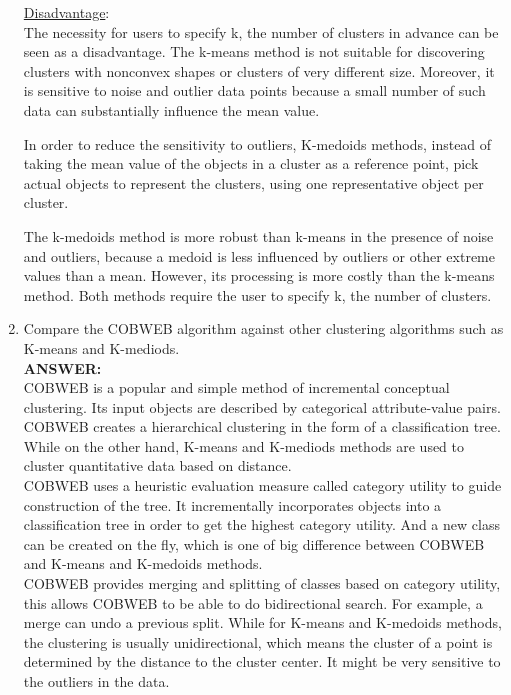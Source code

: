 \documentclass{article}
\begin{document}
\begin{enumerate}
\underline{Disadvantage}:\\
The necessity for users to specify k,
the number of clusters in advance can be seen as a disadvantage. The
k-means method is not suitable for discovering clusters with
nonconvex shapes or clusters of very different size.  Moreover, it is
sensitive to noise and outlier data points because a small number of
such data can substantially influence the mean value.

In order to reduce the sensitivity to outliers, K-medoids methods,
instead of taking the mean value of the objects in a cluster as a
reference point, pick actual objects to represent the clusters, using
one representative object per cluster.

The k-medoids method is more robust than k-means in the presence of
noise and outliers, because a medoid is less influenced by outliers or
other extreme values than a mean. However, its processing is more
costly than the k-means method. Both methods require the user to
specify k, the number of clusters.


\item Compare the COBWEB algorithm against other clustering algorithms
  such as K-means and K-mediods. \\
\textbf{ANSWER:} \\
COBWEB is a popular and simple method of incremental conceptual
clustering. Its input objects are described by categorical
attribute-value pairs. COBWEB creates a hierarchical clustering in
the form of a classification tree. While on the other hand, K-means
and K-mediods methods are used to cluster quantitative data based on
distance. \\ 
COBWEB uses a heuristic evaluation measure called category utility
to guide construction of the tree. It incrementally incorporates
objects into a classification tree in order to get the highest category
utility. And a new class can be created on the fly, which is one of
big difference between COBWEB and K-means and K-medoids methods. \\
COBWEB provides merging and splitting of classes based on category
utility, this allows COBWEB to be able to do bidirectional search. For
example, a merge can undo a previous split. While for K-means and
K-medoids methods, the clustering is usually unidirectional, which
means the cluster of a point is determined by the distance to the
cluster center. It might be very sensitive to the outliers in the
data. 


\end{enumerate}
\end{document}
